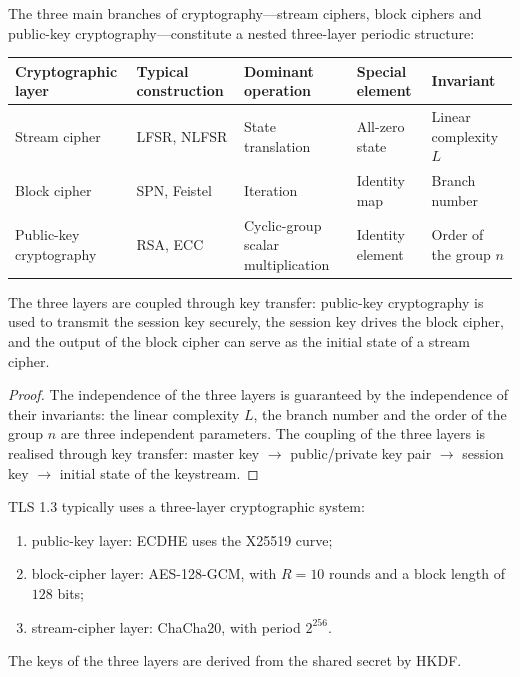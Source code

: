 \begin{theorem}\label{thm:crypto_three_layer_structure}
The three main branches of cryptography---stream ciphers, block ciphers and public-key cryptography---constitute a nested three-layer periodic structure:
\begin{center}
\begin{tabular}{>{\centering\arraybackslash}p{2.5cm}>{\centering\arraybackslash}p{2.5cm}>{\centering\arraybackslash}p{2cm}>{\centering\arraybackslash}p{2.5cm}>{\centering\arraybackslash}p{2.5cm}}
\toprule
Crypto\-graphic layer & Typical construction & Dominant operation & Special element & Invariant \\
\midrule
Stream cipher & LFSR, NLFSR & State translation & All-zero state & Linear complexity \(L\) \\
Block cipher & SPN, Feistel & Iteration & Identity map & Branch number \\
Public-key cryptography & RSA, ECC & Cyclic-group scalar multiplication & Identity element & Order of the group \(n\) \\
\bottomrule
\end{tabular}
\end{center}
The three layers are coupled through key transfer: public-key cryptography is used to transmit the session key securely, the session key drives the block cipher, and the output of the block cipher can serve as the initial state of a stream cipher.
\end{theorem}

\begin{proof}
The independence of the three layers is guaranteed by the independence of their invariants: the linear complexity \(L\), the branch number and the order of the group \(n\) are three independent parameters. The coupling of the three layers is realised through key transfer: master key \(\to\) public/private key pair \(\to\) session key \(\to\) initial state of the keystream.
\end{proof}

\begin{example}\label{ex:tls_layers}
TLS 1.3 typically uses a three-layer cryptographic system:
\begin{enumerate}[label=(\roman*)]
    \item public-key layer: ECDHE uses the X25519 curve;
    \item block-cipher layer: AES-128-GCM, with \(R=10\) rounds and a block length of \(128\) bits;
    \item stream-cipher layer: ChaCha20, with period \(2^{256}\).
\end{enumerate}
The keys of the three layers are derived from the shared secret by HKDF.
\end{example}

